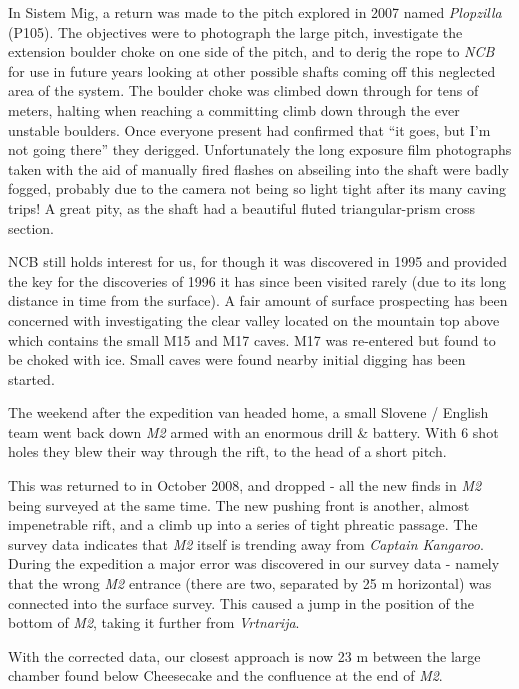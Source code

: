 In Sistem Mig, a return was made to the pitch explored in 2007 named
\emph{Plopzilla} (P105). The objectives were to photograph the large
pitch, investigate the extension boulder choke on one side of the pitch,
and to derig the rope to \emph{NCB} for use in future years looking at
other possible shafts coming off this neglected area of the system. The
boulder choke was climbed down through for tens of meters, halting when
reaching a committing climb down through the ever unstable boulders.
Once everyone present had confirmed that ``it goes, but I'm not going
there'' they derigged. Unfortunately the long exposure film photographs
taken with the aid of manually fired flashes on abseiling into the shaft
were badly fogged, probably due to the camera not being so light tight
after its many caving trips! A great pity, as the shaft had a beautiful
fluted triangular-prism cross section.

NCB still holds interest for us, for though it was discovered in 1995
and provided the key for the discoveries of 1996 it has since been
visited rarely (due to its long distance in time from the surface). A
fair amount of surface prospecting has been concerned with investigating
the clear valley located on the mountain top above which contains the
small M15 and M17 caves. M17 was re-entered but found to be choked with
ice. Small caves were found nearby initial digging has been started.

The weekend after the expedition van headed home, a small Slovene /
English team went back down \emph{M2} armed with an enormous drill \&
battery. With 6 shot holes they blew their way through the rift, to the
head of a short pitch.

This was returned to in October 2008, and dropped - all the new finds in
\emph{M2} being surveyed at the same time. The new pushing front is
another, almost impenetrable rift, and a climb up into a series of tight
phreatic passage. The survey data indicates that \emph{M2} itself is
trending away from \emph{Captain Kangaroo}. During the expedition a
major error was discovered in our survey data - namely that the wrong
\emph{M2} entrance (there are two, separated by 25 m horizontal) was
connected into the surface survey. This caused a jump in the position of
the bottom of \emph{M2}, taking it further from \emph{Vrtnarija}.

With the corrected data, our closest approach is now 23 m between the
large chamber found below Cheesecake and the confluence at the end of
\emph{M2}.

